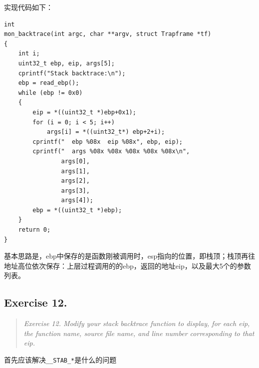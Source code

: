 实现代码如下：\\
\begin{lstlisting}
int
mon_backtrace(int argc, char **argv, struct Trapframe *tf)
{
    int i;
    uint32_t ebp, eip, args[5];
    cprintf("Stack backtrace:\n");
    ebp = read_ebp();
    while (ebp != 0x0)
    {
        eip = *((uint32_t *)ebp+0x1);
        for (i = 0; i < 5; i++)
            args[i] = *((uint32_t*) ebp+2+i);
        cprintf("  ebp %08x  eip %08x", ebp, eip);
        cprintf("  args %08x %08x %08x %08x %08x\n", 
                args[0], 
                args[1], 
                args[2], 
                args[3], 
                args[4]);
        ebp = *((uint32_t *)ebp);
    }
    return 0;
}
\end{lstlisting}

基本思路是，ebp中保存的是函数刚被调用时，esp指向的位置，即栈顶；栈顶再往地址高位依次保存：上层过程调用的的ebp，返回的地址eip，以及最大5个的参数列表。

\subsection{Exercise 12.}
\begin{quote} \textit{Exercise 12. Modify your stack backtrace function to display, for each eip, the function name, source file name, and line number corresponding to that eip.} \end{quote}

首先应该解决\lstinline{__STAB_*}是什么的问题

